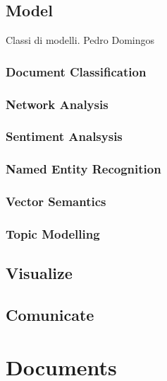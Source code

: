\documentclass[]{book}
\begin{document}
\subsection{Model}\label{sotatoolsmodel}

Classi di modelli. Pedro Domingos

\subsubsection{Document Classification}\label{sotatoolsmodeldocclass}

\subsubsection{Network Analysis}\label{sotatoolsmodelnetanal}

\subsubsection{Sentiment Analsysis}\label{sotatoolsmodelsentanal}

\subsubsection{Named Entity Recognition}\label{sotatoolsmodelner}

\subsubsection{Vector Semantics}\label{sotatoolsmodelvec}

\subsubsection{Topic Modelling}\label{sotatoolsmodeltopicmodel}

\subsection{Visualize}\label{sotatoolsvisualize}

\subsection{Comunicate}\label{sotatoolscomunicate}

\section{Documents}\label{sotadocuments}
\end{document}
